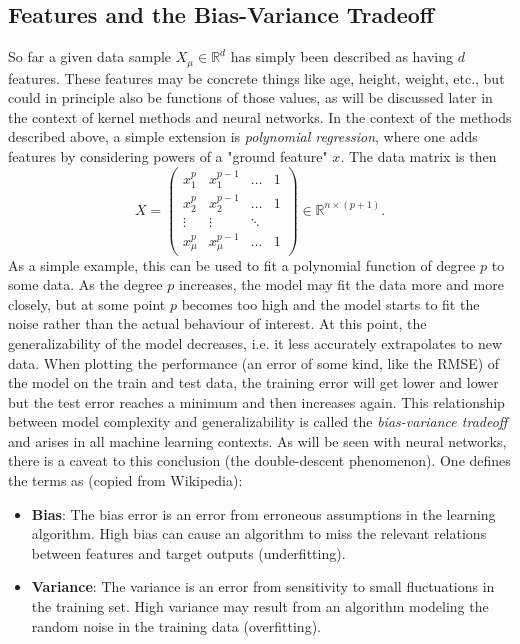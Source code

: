 \documentclass{article}
\begin{document}
\subsection{Features and the Bias-Variance Tradeoff}
So far a given data sample $X_{\mu}\in\mathbb{R}^d$ has simply been described as having $d$ features. These features may be concrete things like age, height, weight, etc., but could in principle also be functions of those values, as will be discussed later in the context of kernel methods and neural networks. In the context of the methods described above, a simple extension is \emph{polynomial regression}, where one adds features by considering powers of a "ground feature" $x$. The data matrix is then
\begin{equation}
    X =
    \begin{pmatrix}
        x_1^p & x_1^{p-1} & \dots & 1 \\
        x_2^p & x_2^{p-1} & \dots & 1 \\
        \vdots & \vdots & \ddots & \\
        x_{\mu}^p & x_{\mu}^{p-1} & \dots & 1
    \end{pmatrix}
    \in \mathbb{R}^{n\times (p+1)}.
\end{equation}
As a simple example, this can be used to fit a polynomial function of degree $p$ to some data. As the degree $p$ increases, the model may fit the data more and more closely, but at some point $p$ becomes too high and the model starts to fit the noise rather than the actual behaviour of interest. At this point, the generalizability of the model decreases, i.e. it less accurately extrapolates to new data. When plotting the performance (an error of some kind, like the RMSE) of the model on the train and test data, the training error will get lower and lower but the test error reaches a minimum and then increases again. This relationship between model complexity and generalizability is called the \emph{bias-variance tradeoff} and arises in all machine learning contexts. As will be seen with neural networks, there is a caveat to this conclusion (the double-descent phenomenon). One defines the terms as (copied from Wikipedia):
\begin{itemize}
    \item \textbf{Bias}: The bias error is an error from erroneous assumptions in the learning algorithm. High bias can cause an algorithm to miss the relevant relations between features and target outputs (underfitting).
    \item \textbf{Variance}: The variance is an error from sensitivity to small fluctuations in the training set. High variance may result from an algorithm modeling the random noise in the training data (overfitting).
\end{itemize}
\end{document}
